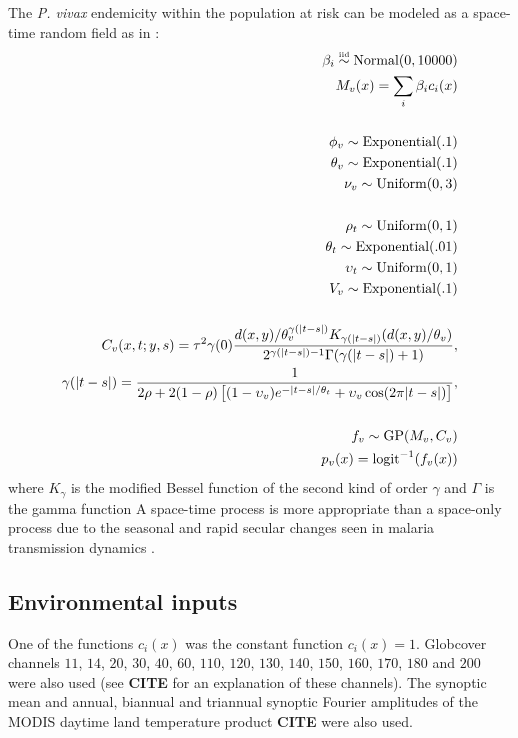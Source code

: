 The \emph{P. vivax} endemicity within the population at risk can be modeled as a space-time random field as in \cite{hay2008}:
\begin{eqnarray*}
    \beta_{i} \stackrel{\textup{\tiny iid}}{\sim} \textup{Normal}(0,10000)\\
    M_v(x) = \sum_i\beta_ic_i(x)\\
    \\
    \phi_v\sim\textup{Exponential}(.1)\\
    \theta_v\sim\textup{Exponential}(.1)\\
    \nu_v\sim\textup{Uniform}(0,3)\\
    \\
    \rho_t\sim \textup{Uniform}(0,1) \\
    \theta_t\sim \textup{Exponential}(.01) \\
    \upsilon_t\sim \textup{Uniform}(0,1)\\
    V_v\sim\textup{Exponential}(.1)\\   
    \\ C_v(x,t;y,s)=\tau^2\gamma(0)\frac{d(x,y)/\theta_v^{\gamma(|t-s|)}K_{\gamma(|t-s|)}(d(x,y)/\theta_v)}{2^{\gamma(|t-s|)-1}\Gamma(\gamma(|t-s|)+1)},\\ 
    \gamma(|t-s|) = \frac{1}{2\rho+2(1-\rho)\left[(1-\upsilon_v)e^{-|t-s|/\theta_t}+\upsilon_v\cos(2\pi |t-s|)\right]},\\
    \\
    f_v\sim\textup{GP}(M_v, C_v)\\
    p_v(x)=\textup{logit}^{-1}(f_{v}(x))
\end{eqnarray*} 
where $K_\gamma$ is the modified Bessel function of the second kind of order $\gamma$ and $\Gamma$ is the gamma function \cite{whatever you cited in PLOS paper.}  A space-time process is more appropriate than a space-only process due to the seasonal and rapid secular changes seen in malaria transmission dynamics \cite{blah}. 

\subsection*{Environmental inputs}
One of the functions $c_i(x)$ was the constant function $c_i(x)=1$. Globcover channels $11$, $14$, $20$, $30$, $40$, $60$, $110$, $120$, $130$, $140$, $150$, $160$, $170$, $180$ and $200$ were also used (see \textbf{CITE} for an explanation of these channels). The synoptic mean and annual, biannual and triannual synoptic Fourier amplitudes of the MODIS daytime land temperature product \textbf{CITE} were also used.

